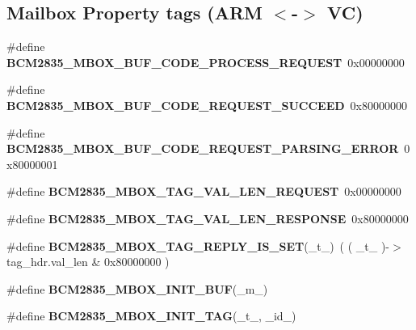 \subsection*{Mailbox Property tags (A\+RM $<$-\/$>$ VC)}
\begin{DoxyCompactItemize}
\item 
\mbox{\label{group__raspberrypi__vc_ga3c46c1d215ad00bf1024feb1b4b35df8}} 
\#define {\bfseries B\+C\+M2835\+\_\+\+M\+B\+O\+X\+\_\+\+B\+U\+F\+\_\+\+C\+O\+D\+E\+\_\+\+P\+R\+O\+C\+E\+S\+S\+\_\+\+R\+E\+Q\+U\+E\+ST}~0x00000000
\item 
\mbox{\label{group__raspberrypi__vc_ga5eab7b1752507a76fbae9ee9e32369c6}} 
\#define {\bfseries B\+C\+M2835\+\_\+\+M\+B\+O\+X\+\_\+\+B\+U\+F\+\_\+\+C\+O\+D\+E\+\_\+\+R\+E\+Q\+U\+E\+S\+T\+\_\+\+S\+U\+C\+C\+E\+ED}~0x80000000
\item 
\mbox{\label{group__raspberrypi__vc_ga0c88c23305a599b339f3909de9d8abd3}} 
\#define {\bfseries B\+C\+M2835\+\_\+\+M\+B\+O\+X\+\_\+\+B\+U\+F\+\_\+\+C\+O\+D\+E\+\_\+\+R\+E\+Q\+U\+E\+S\+T\+\_\+\+P\+A\+R\+S\+I\+N\+G\+\_\+\+E\+R\+R\+OR}~0x80000001
\item 
\mbox{\label{group__raspberrypi__vc_gab9cf37fd1091ec4e71782d5fa1a85005}} 
\#define {\bfseries B\+C\+M2835\+\_\+\+M\+B\+O\+X\+\_\+\+T\+A\+G\+\_\+\+V\+A\+L\+\_\+\+L\+E\+N\+\_\+\+R\+E\+Q\+U\+E\+ST}~0x00000000
\item 
\mbox{\label{group__raspberrypi__vc_ga4d9610559aaa88bf541efe01a60040db}} 
\#define {\bfseries B\+C\+M2835\+\_\+\+M\+B\+O\+X\+\_\+\+T\+A\+G\+\_\+\+V\+A\+L\+\_\+\+L\+E\+N\+\_\+\+R\+E\+S\+P\+O\+N\+SE}~0x80000000
\item 
\mbox{\label{group__raspberrypi__vc_ga90feb12431b6383f65e3998f85a29685}} 
\#define {\bfseries B\+C\+M2835\+\_\+\+M\+B\+O\+X\+\_\+\+T\+A\+G\+\_\+\+R\+E\+P\+L\+Y\+\_\+\+I\+S\+\_\+\+S\+ET}(\+\_\+t\+\_\+)~( ( \+\_\+t\+\_\+ )-\/$>$tag\+\_\+hdr.\+val\+\_\+len \& 0x80000000 )
\item 
\#define {\bfseries B\+C\+M2835\+\_\+\+M\+B\+O\+X\+\_\+\+I\+N\+I\+T\+\_\+\+B\+UF}(\+\_\+m\+\_\+)
\item 
\#define {\bfseries B\+C\+M2835\+\_\+\+M\+B\+O\+X\+\_\+\+I\+N\+I\+T\+\_\+\+T\+AG}(\+\_\+t\+\_\+,  \+\_\+id\+\_\+)

\end{DoxyCompactItemize}
